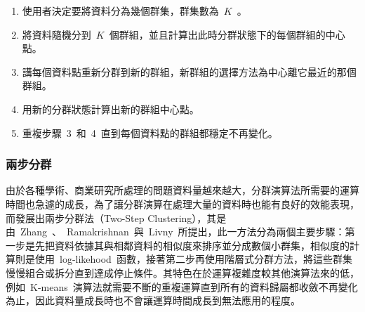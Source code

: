 \begin{enumerate}
\item 使用者決定要將資料分為幾個群集，群集數為~$K$~。
\item 將資料隨機分到~$K$~個群組，並且計算出此時分群狀態下的每個群組的中心點。
\item 講每個資料點重新分群到新的群組，新群組的選擇方法為中心離它最近的那個群組。
\item 用新的分群狀態計算出新的群組中心點。
\item 重複步驟~3~和~4~直到每個資料點的群組都穩定不再變化。
\end{enumerate}




\subsubsection{兩步分群}

由於各種學術、商業研究所處理的問題資料量越來越大，分群演算法所需要的運算時間也急遽的成長，為了讓分群演算在處理大量的資料時也能有良好的效能表現，而發展出兩步分群法（Two-Step Clustering），其是由~Zhang~、~Ramakrishnan~與~Livny\cite{zhang1996birch}~所提出，此一方法分為兩個主要步驟：第一步是先把資料依據其與相鄰資料的相似度來排序並分成數個小群集，相似度的計算則是使用~log-likehood~函數，接著第二步再使用階層式分群方法，將這些群集慢慢組合或拆分直到達成停止條件。其特色在於運算複雜度較其他演算法來的低，例如~K-means~演算法就需要不斷的重複運算直到所有的資料歸屬都收斂不再變化為止，因此資料量成長時也不會讓運算時間成長到無法應用的程度。


